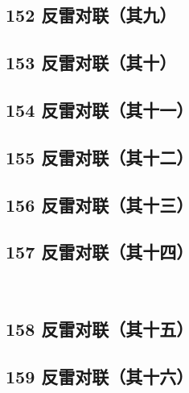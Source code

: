 \hypertarget{ux53cdux96f7ux5bf9ux8054ux5176ux4e5d}{%
\subsection{152
反雷对联（其九）}\label{ux53cdux96f7ux5bf9ux8054ux5176ux4e5d}}

\hypertarget{ux53cdux96f7ux5bf9ux8054ux5176ux5341}{%
\subsection{153
反雷对联（其十）}\label{ux53cdux96f7ux5bf9ux8054ux5176ux5341}}

\hypertarget{ux53cdux96f7ux5bf9ux8054ux5176ux5341ux4e00}{%
\subsection{154
反雷对联（其十一）}\label{ux53cdux96f7ux5bf9ux8054ux5176ux5341ux4e00}}

\hypertarget{ux53cdux96f7ux5bf9ux8054ux5176ux5341ux4e8c}{%
\subsection{155
反雷对联（其十二）}\label{ux53cdux96f7ux5bf9ux8054ux5176ux5341ux4e8c}}

\hypertarget{ux53cdux96f7ux5bf9ux8054ux5176ux5341ux4e09}{%
\subsection{156
反雷对联（其十三）}\label{ux53cdux96f7ux5bf9ux8054ux5176ux5341ux4e09}}

\hypertarget{ux53cdux96f7ux5bf9ux8054ux5176ux5341ux56db}{%
\subsection{157
反雷对联（其十四）}\label{ux53cdux96f7ux5bf9ux8054ux5176ux5341ux56db}}

~\\

\hypertarget{ux53cdux96f7ux5bf9ux8054ux5176ux5341ux4e94}{%
\subsection{158
反雷对联（其十五）}\label{ux53cdux96f7ux5bf9ux8054ux5176ux5341ux4e94}}

\hypertarget{ux53cdux96f7ux5bf9ux8054ux5176ux5341ux516d}{%
\subsection{159
反雷对联（其十六）}\label{ux53cdux96f7ux5bf9ux8054ux5176ux5341ux516d}}

